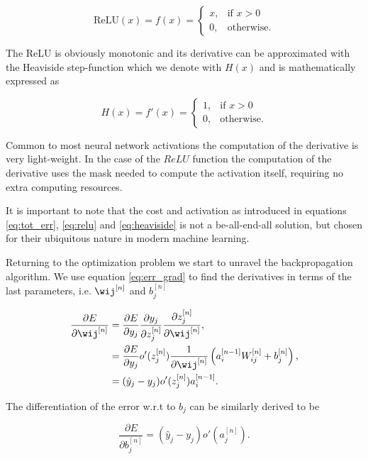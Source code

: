 \begin{equation}\label{eq:relu}
	\text{ReLU} (x) = f(x) = \begin{cases}
	x, & \text{if } x > 0 \\
	0,  & \text{otherwise} .
	\end{cases}
\end{equation}

\noindent The ReLU is obviously monotonic and its derivative can be approximated with the Heaviside step-function which we denote with $H(x)$ and is mathematically expressed as 

\begin{equation}\label{eq:heaviside}
H(x) = f'(x) = 	\begin{cases}1, & \text{if } x > 0 \\
	0,  & \text{otherwise}.
\end{cases}
\end{equation}

\noindent Common to most neural network activations the computation of the derivative is very light-weight. In the case of the $ReLU$ function the computation of the derivative uses the mask needed to compute the activation itself, requiring no extra computing resources. 

It is important to note that the cost and activation as introduced in equations \ref{eq:tot_err}, \ref{eq:relu} and \ref{eq:heaviside} is not a be-all-end-all solution, but chosen for their ubiquitous nature in modern machine learning.

Returning to the optimization problem we start to unravel the backpropagation algorithm. We use equation \ref{eq:err_grad} to find the derivatives in terms of the last parameters, i.e. $\wij^{[n]}$ and $b_j^{[n]}$

\begin{align}
\frac{\partial E}{\partial \wij^{[n]}} &= 
\frac{\partial E}{\partial y_j} 
\frac{\partial y_j}{\partial z_j^{[n]}}
\frac{\partial z_j^{[n]}}{\partial \wij^{[n]}}, \\
&= \frac{\partial E}{\partial y_j} o'(z^{[n]}_j)
\frac{1}{\partial \wij^{[n]}} \left(a^{[n-1]}_iW^{[n]}_{ij} + b^{[n]}_j\right), \\
&= (\hat{y}_j - y_j)o'(z^{[n]}_j) a^{[n-1]}_i. \label{eq:backprop_w}
\end{align}

\noindent The differentiation of the error w.r.t to $b_j$ can be similarly derived to be 

\begin{equation}\label{eq:backprop_b}
\frac{\partial E}{\partial b_j^{[n]}}= (\hat{y}_j - y_j)o'(a^{[n]}_j).
\end{equation}

